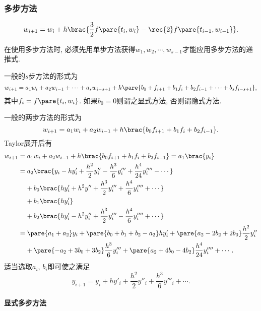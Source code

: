 \documentclass{ctexart}
\begin{document}

\subsubsection{多步方法} %
\label{ssub:多步方法}

\begin{theorem}
    \[ w_{i+1} = w_i + h\brac{\frac{3}{2}f\pare{t_i,w_i} - \rec{2}f\pare{t_{i-1}, w_{i-1}}}. \]
\end{theorem}
在使用多步方法时, 必须先用单步方法获得$w_1,w_2,\cdots,w_{s-1}$才能应用多步方法的递推式.
\par
一般的$s$步方法的形式为
\[ w_{i+1} = a_1w_i + a_2w_{i-1} + \cdots + a_s w_{i-s+1} + h\pare{b_0 + f_{i+1} + b_1 f_{i} + b_2f_{i-1} + \cdots + b_s f_{i-s+1}}, \]
其中$f_i = f\pare{t_i,w_i}$. 如果$b_0 = 0$则谓之显式方法, 否则谓隐式方法.
\par
一般的两步方法的形式为
\[ w_{i+1} = a_1 w_i + a_2 w_{i-1} + h\brac{b_0 f_{i+1} + b_1f_i + b_2 f_{i-1}}. \]
Taylor展开后有
\begin{align*}
    w_{i+1} &= a_1 w_i + a_2 w_{i-1} + h\brac{b_0f_{i+1} + b_1 f_i + b_2 f_{i-1}} = a_1\brac{y_i} \\
    &= a_2\brac{y_i - hy'_i + \frac{h^2}{2}y''_i - \frac{h^3}{6}y'''_i + \frac{h^4}{24}y''''_i - \cdots} \\
    &\phantom{=\ }+ b_0\brac{hy'_i + h^2 y'' + \frac{h^3}{2}y'''_i + \frac{h^4}{6}y''''_i + \cdots} \\
    &\phantom{=\ }+ b_1\brac{h y'_i} \\
    &\phantom{=\ }+ b_2\brac{hy'_i - h^2y''_i + \frac{h^3}{2}y'''_i - \frac{h^4}{6}y''''_i + \cdots} \\
    &= \pare{a_1 + a_2}y_i + \pare{b_0 + b_1 + b_2 - a_2}hy'_i + \pare{a_2 - 2b_2 + 2b_0} \frac{h^2}{2} y''_i \\
    &\phantom{=\ } + \pare{-a_2 + 3b_0 + 3b_2}\frac{h^3}{6}y'''_i + \pare{a_2 + 4b_0 - 4b_2}\frac{h^4}{24}y''''_i + \cdots.
\end{align*}
适当选取$a_i$, $b_i$即可使之满足
\[ y_{i+1} = y_i + hy'_i + \frac{h^2}{2}y''_i + \frac{h^3}{6}y'''_i + \cdots. \]

\paragraph{显式多步方法} %
\label{par:显式多步方法}
\end{document}
